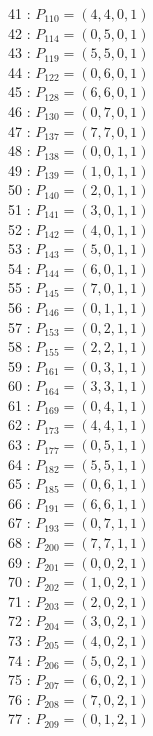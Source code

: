 \documentclass{article}
\begin{document}
{\begin{multicols}{3}
41 : $P_{110}=( 4, 4, 0, 1 )$\\
42 : $P_{114}=( 0, 5, 0, 1 )$\\
43 : $P_{119}=( 5, 5, 0, 1 )$\\
44 : $P_{122}=( 0, 6, 0, 1 )$\\
45 : $P_{128}=( 6, 6, 0, 1 )$\\
46 : $P_{130}=( 0, 7, 0, 1 )$\\
47 : $P_{137}=( 7, 7, 0, 1 )$\\
48 : $P_{138}=( 0, 0, 1, 1 )$\\
49 : $P_{139}=( 1, 0, 1, 1 )$\\
50 : $P_{140}=( 2, 0, 1, 1 )$\\
51 : $P_{141}=( 3, 0, 1, 1 )$\\
52 : $P_{142}=( 4, 0, 1, 1 )$\\
53 : $P_{143}=( 5, 0, 1, 1 )$\\
54 : $P_{144}=( 6, 0, 1, 1 )$\\
55 : $P_{145}=( 7, 0, 1, 1 )$\\
56 : $P_{146}=( 0, 1, 1, 1 )$\\
57 : $P_{153}=( 0, 2, 1, 1 )$\\
58 : $P_{155}=( 2, 2, 1, 1 )$\\
59 : $P_{161}=( 0, 3, 1, 1 )$\\
60 : $P_{164}=( 3, 3, 1, 1 )$\\
61 : $P_{169}=( 0, 4, 1, 1 )$\\
62 : $P_{173}=( 4, 4, 1, 1 )$\\
63 : $P_{177}=( 0, 5, 1, 1 )$\\
64 : $P_{182}=( 5, 5, 1, 1 )$\\
65 : $P_{185}=( 0, 6, 1, 1 )$\\
66 : $P_{191}=( 6, 6, 1, 1 )$\\
67 : $P_{193}=( 0, 7, 1, 1 )$\\
68 : $P_{200}=( 7, 7, 1, 1 )$\\
69 : $P_{201}=( 0, 0, 2, 1 )$\\
70 : $P_{202}=( 1, 0, 2, 1 )$\\
71 : $P_{203}=( 2, 0, 2, 1 )$\\
72 : $P_{204}=( 3, 0, 2, 1 )$\\
73 : $P_{205}=( 4, 0, 2, 1 )$\\
74 : $P_{206}=( 5, 0, 2, 1 )$\\
75 : $P_{207}=( 6, 0, 2, 1 )$\\
76 : $P_{208}=( 7, 0, 2, 1 )$\\
77 : $P_{209}=( 0, 1, 2, 1 )$\\

\end{multicols}}
\end{document}
